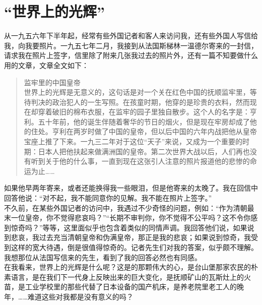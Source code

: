 \fancyhead[RO]{} %
\fancyhead[LE]{} %
\chapter*{“世界上的光辉”}
\thispagestyle{empty}
从一九五六年下半年起，经常有些外国记者和客人来访问我，还有些外国人写信给我，向我要照片。一九五七年二月，我接到从法国斯梯林一温德尔寄来的一封信，请求我在照片上签字，信里除了附来几张我过去的照片外，还有一篇不知要做什么用的文章，文章全文如下：\\

\begin{quote}
	监牢里的中国皇帝\\

世界上的光辉是无意义的，这句话是对一个关在红色中国的抚顺监牢里，等待判决的政治犯人的一生写照。在孩童时期，他穿的是珍贵的衣料，然而现在却穿着破旧的棉布衣服，在监牢的园子里独自散步。这个人的名字是：亨利。五十年前，他的诞生伴随着奢华的节日的烟火，但是现在牢房却成了他的住处。亨利在两岁时做了中国的皇帝，但以后中国的六年内战把他从皇帝宝座上推了下来。一九三二年对于这位“天子”来说，又成为一个重要的时期：日本人把他扶起来做满洲国的皇帝。第二次世界大战以后，人们再也没有听到关于他的什么事，一直到现在这张引人注意的照片报道他的悲惨的命运为止……\\
\end{quote}

如果他早两年寄来，或者还能换得我一些眼泪，但是他寄来的太晚了。我在回信中回答他说：“对不起，我不能同意你的见解。我不能在照片上签字。”\\

不久前，在某些外国记者的访问中，我遇过不少奇怪的问题，例如：“作为清朝最末一位皇帝，你不觉得悲哀吗？”“长期不审判你，你不觉得不公平吗？这不令你感到惊奇吗？”等等，这里面似乎也包含着类似的同情声调。我回答他们说，如果说到悲哀，我过去充当清朝皇帝和伪满皇帝，那正是我的悲哀；如果说到惊奇，我受到这样的宽大待遇，倒是很值得惊奇的。记者先生们对我的答案，似乎颇不理解。我想那位从法国写信来的先生，看到了我的回答必然也有同感。\\

在我看来，世界上的光辉是什么呢？这是的那颗伟大的心，是台山堡那家农民的朴素语言，是在我们下一代身上反映出来的巨大变化，是抚顺矿山的瓦斯灶上的火苗，是工业学校里的那些代替了日本设备的国产机床，是养老院里老工人的晚年，……难道这些对我都是没有意义的吗？\\

